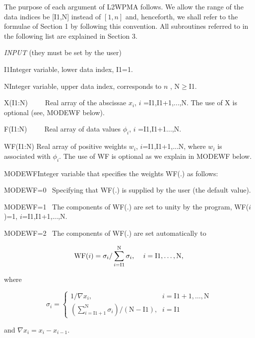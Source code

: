 \documentclass[acmtoms]{acmtrans2m}
\begin{document}
The purpose of each argument of L2WPMA follows. We allow the range of the
data indices be [I1,N] instead of $[1,n]$ and, henceforth, we shall refer to
the formulae of Section 1 by following this convention. All subroutines
referred to in the following list are explained in Section 3.

\bigskip

\textit{INPUT} (they must be set by the user)

I1\qquad \qquad \qquad Integer variable, lower data index, I1=1.

N\qquad \qquad \qquad Integer variable, upper data index, corresponds to $n$%
, N$\geq $I1.

X(I1:N)\qquad\ \ \ \ \ Real array of the abscissae $x_{i}$, $i$%
=I1,I1+1,...,N. The use of X is optional (see, MODEWF below).

F(I1:N)\qquad\ \ \ \ \ Real array of data values $\phi _{i}$, $i$%
=I1,I1+1...,N.

WF(I1:N) \qquad Real array of positive weights $w_{i}$, $i$=I1,I1+1,...N,
where $w_{i}$ is associated with $\phi _{i}$. The use of WF is optional as
we explain in MODEWF below.

MODEWF\qquad Integer variable that specifies the weights WF(.) as follows:

\qquad MODEWF=0 \ Specifying that WF(.) is supplied by the user (the default
value).

\qquad MODEWF=1 \ The components of WF(.) are set to unity by the program,
WF($i$)=1, $i$=I1,I1+1,...,N.

\qquad MODEWF=2 \ The components of WF(.) are set automatically to

\begin{equation}
\text{WF}(i)=\sigma _{i}/\sum_{i=\text{I1}}^{\text{N}}\sigma _{i}\text{, \ \
\ }i=\text{I1},\ldots ,\text{N,}  \label{2.1}
\end{equation}

where

\begin{equation}
\sigma _{i}=\left\{ 
\begin{array}{ll}
1/\nabla x_{i}\text{,} & i=\text{I1}+1,\ldots ,\text{N} \\ 
\left( \sum_{i=\text{I1}+1}^{\text{N}}\sigma _{i}\right) /(\text{N}-\text{I1}%
)\text{,} & i=\text{I1}
\end{array}
\right.  \label{2.2}
\end{equation}

and $\nabla x_{i}=x_{i}-x_{i-1}$.
\end{document}

